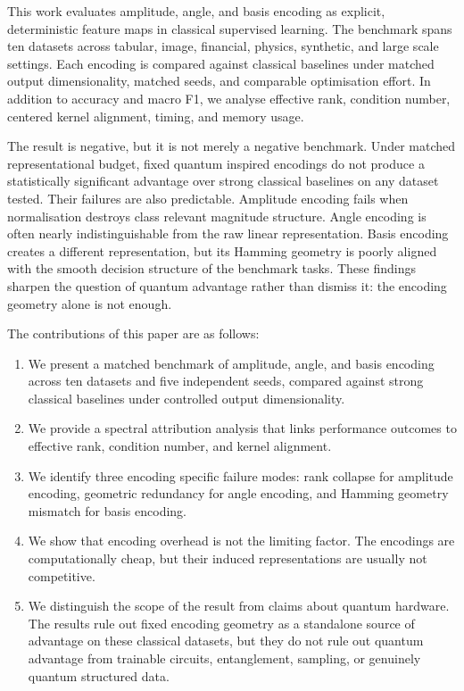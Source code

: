 \documentclass[12pt]{article}
\begin{document}
This work evaluates amplitude, angle, and basis encoding as explicit,
deterministic feature maps in classical supervised learning. The benchmark spans
ten datasets across tabular, image, financial, physics, synthetic, and large
scale settings. Each encoding is compared against classical baselines under
matched output dimensionality, matched seeds, and comparable optimisation
effort. In addition to accuracy and macro F1, we analyse effective rank,
condition number, centered kernel alignment, timing, and memory usage.

The result is negative, but it is not merely a negative benchmark. Under matched
representational budget, fixed quantum inspired encodings do not produce a
statistically significant advantage over strong classical baselines on any
dataset tested. Their failures are also predictable. Amplitude encoding fails
when normalisation destroys class relevant magnitude structure. Angle encoding
is often nearly indistinguishable from the raw linear representation. Basis
encoding creates a different representation, but its Hamming geometry is poorly
aligned with the smooth decision structure of the benchmark tasks. These
findings sharpen the question of quantum advantage rather than dismiss it: the
encoding geometry alone is not enough.

The contributions of this paper are as follows:
\begin{enumerate}
  \item We present a matched benchmark of amplitude, angle, and basis encoding
        across ten datasets and five independent seeds, compared against strong
        classical baselines under controlled output dimensionality.
  \item We provide a spectral attribution analysis that links performance
        outcomes to effective rank, condition number, and kernel alignment.
  \item We identify three encoding specific failure modes: rank collapse for
        amplitude encoding, geometric redundancy for angle encoding, and Hamming
        geometry mismatch for basis encoding.
  \item We show that encoding overhead is not the limiting factor. The
        encodings are computationally cheap, but their induced representations
        are usually not competitive.
  \item We distinguish the scope of the result from claims about quantum
        hardware. The results rule out fixed encoding geometry as a standalone
        source of advantage on these classical datasets, but they do not rule
        out quantum advantage from trainable circuits, entanglement, sampling,
        or genuinely quantum structured data.
\end{enumerate}
\end{document}
